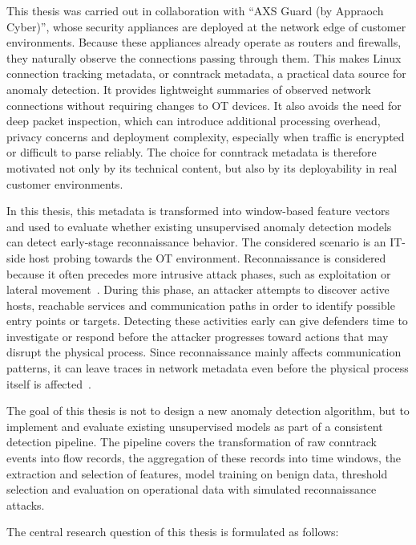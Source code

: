 This thesis was carried out in collaboration with ``AXS Guard (by Appraoch Cyber)'', whose security appliances are deployed at the network edge of customer environments. Because these appliances already operate as routers and firewalls, they naturally observe the connections passing through them. This makes Linux connection tracking metadata, or conntrack metadata, a practical data source for anomaly detection. It provides lightweight summaries of observed network connections without requiring changes to OT devices. It also avoids the need for deep packet inspection, which can introduce additional processing overhead, privacy concerns and deployment complexity, especially when traffic is encrypted or difficult to parse reliably. The choice for conntrack metadata is therefore motivated not only by its technical content, but also by its deployability in real customer environments.

In this thesis, this metadata is transformed into window-based feature vectors and used to evaluate whether existing unsupervised anomaly detection models can detect early-stage reconnaissance behavior. The considered scenario is an IT-side host probing towards the OT environment. Reconnaissance is considered because it often precedes more intrusive attack phases, such as exploitation or lateral movement~\cite{behdadnia_early-stage_2025}. During this phase, an attacker attempts to discover active hosts, reachable services and communication paths in order to identify possible entry points or targets. Detecting these activities early can give defenders time to investigate or respond before the attacker progresses toward actions that may disrupt the physical process. Since reconnaissance mainly affects communication patterns, it can leave traces in network metadata even before the physical process itself is affected~\cite{zaidy_comprehensive_2025, cabana_detecting_2019}.



The goal of this thesis is not to design a new anomaly detection algorithm, but to implement and evaluate existing unsupervised models as part of a consistent detection pipeline. The pipeline covers the transformation of raw conntrack events into flow records, the aggregation of these records into time windows, the extraction and selection of features, model training on benign data, threshold selection and evaluation on operational data with simulated reconnaissance attacks.

The central research question of this thesis is formulated as follows:



